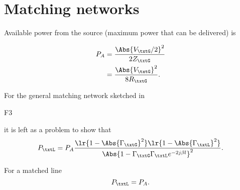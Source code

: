 %
%

\section{Matching networks}

Available power from the source (maximum power that can be delivered) is

\begin{equation}\label{eqn:uwavesDeck6LCmatchingCore:20}
\begin{aligned}
P_A
&= \frac{\Abs{V_\txtG/2}^2}{2 Z_\txtG}
\\ &= \frac{\Abs{V_\txtG}^2}{8 R_\txtG}.
\end{aligned}
\end{equation}

For the general matching network sketched in

F3

it is left as a problem to show that
\begin{equation}\label{eqn:uwavesDeck6LCmatchingCore:40}
P_\txtL = P_A 
\frac{
   \lr{ 1 - \Abs{\Gamma_\txtG}^2 }
   \lr{ 1 - \Abs{\Gamma_\txtL}^2 }
}
{
   \Abs{ 1 - \Gamma_\txtG \Gamma_\txtL e^{-2 j \beta l } }^2
}.
\end{equation}

For a matched line
\begin{equation}\label{eqn:uwavesDeck6LCmatchingCore:60}
P_\txtL = P_A.
\end{equation}

